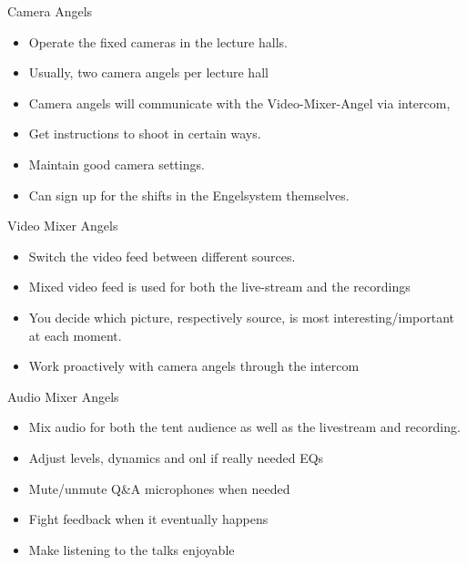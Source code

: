 \documentclass[aspectratio=169]{beamer}
\begin{document}
\begin{frame}{Camera Angels}
	\begin{itemize}
		\item Operate the fixed cameras in the lecture halls. 
		\item Usually, two camera angels per lecture hall 
		\item Camera angels will communicate with the Video-Mixer-Angel via intercom,
		\item Get instructions to shoot in certain ways. 
		\item Maintain good camera settings.
		\item Can sign up for the shifts in the Engelsystem themselves.
	\end{itemize}
\end{frame}

\begin{frame}{Video Mixer Angels}
	\begin{itemize}
		\item Switch the video feed between different sources. 
		\item Mixed video feed is used for both the live-stream and the recordings 
		\item You decide which picture, respectively source, is most interesting/important at each moment.
		\item Work proactively with camera angels through the intercom
	\end{itemize}
\end{frame}


\begin{frame}{Audio Mixer Angels}
	\begin{itemize}
		\item Mix audio for both the tent audience as well as the livestream and recording.
        \item Adjust levels, dynamics and onl if really needed EQs
        \item Mute/unmute Q&A microphones when needed
        \item Fight feedback when it eventually happens
        \item Make listening to the talks enjoyable
	\end{itemize}
\end{frame}
\end{document}
